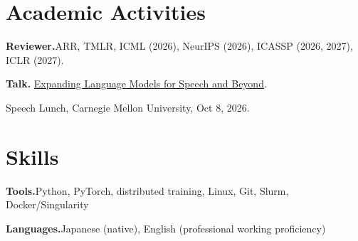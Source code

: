 \documentclass[a4paper,11pt]{article}
\begin{document}
\section{Academic Activities}
\textbf{Reviewer.}\quad ARR, TMLR, ICML (2026), NeurIPS (2026),
ICASSP (2026, 2027), ICLR (2027).\par
\smallskip
\textbf{Talk.}\quad
\href{https://www.wavlab.org/speech_lunch}
{Expanding Language Models for Speech and Beyond}.\par
{\small Speech Lunch, Carnegie Mellon University, Oct 8, 2026.\par}

\section{Skills}
\textbf{Tools.}\quad Python, PyTorch, distributed training, Linux, Git, Slurm, Docker/Singularity\par
\smallskip
\textbf{Languages.}\quad Japanese (native), English (professional working proficiency)
\end{document}
